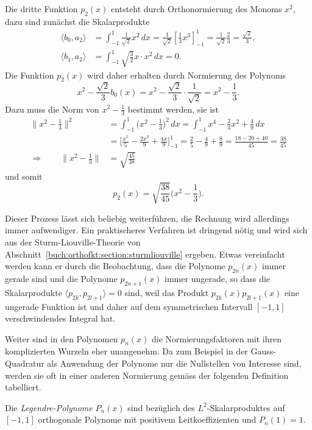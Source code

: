 Die dritte Funktion $p_2(x)$ entsteht durch Orthonormierung des
Monoms $x^2$, dazu sind zunächst die Skalarprodukte
\begin{align*}
\langle b_0,a_2\rangle
&=
\int_{-1}^1 \frac{1}{\!\sqrt{2}}x^2\,dx
=
\frac{1}{\!\sqrt{2}} [\frac13x^3]_{-1}^1
=
\frac{1}{\!\sqrt{2}} \frac{2}{3}
=
\frac{\!\sqrt{2}}{3},
\\
\langle b_1,a_2\rangle
&=
\int_{-1}^1 \!\sqrt{\frac{3}{2}} x \cdot x^2\,dx
= 
0.
\end{align*}
Die Funktion $p_2(x)$ wird daher erhalten durch Normierung des Polynoms
\[
x^2 - 
\frac{\!\sqrt{2}}{3} b_0(x)
=
x^2-
\frac{\!\sqrt{2}}{3}\cdot\frac{1}{\!\sqrt{2}}
=
x^2-\frac13.
\]
Dazu muss die Norm von $x^2-\frac13$ bestimmt werden, sie ist
\begin{align*}
\|x^2-\frac13\|^2
&=
\int_{-1}^1 \biggl(x^2-\frac13\biggr)^2\,dx
=
\int_{-1}^1 x^4-\frac23x^2+\frac{4}{9}\,dx
\\
&=
\biggl[\frac{x^5}{5} -\frac{2x^3}{9}+\frac{4x}{9}\biggr]_{-1}^1
=
\frac{2}{5} - \frac{4}{9} + \frac{8}{9}
=
\frac{18-20+40}{45}
=
\frac{38}{45}
\\
\Rightarrow\qquad
\|x^2-\frac13\|
&=
\!\sqrt{\frac{45}{38}}
\end{align*}
und somit
\[
p_2(x)
= 
\!\sqrt{\frac{38}{45}} \biggl(x^2-\frac13\biggr).
\]

Dieser Prozess lässt sich beliebig weiterführen, die Rechnung wird
allerdings immer aufwendiger.
Ein praktischeres Verfahren ist dringend nötig und wird sich
aus der Sturm-Liouville-Theorie von
Abschnitt~\ref{buch:orthofkt:section:sturmliouville} ergeben.
Etwas vereinfacht werden kann er durch die Beobachtung, dass die
Polynome $p_{2n}(x)$ immer gerade sind und die Polynome $p_{2n+1}(x)$
immer ungerade, so dass die Skalarprodukte 
$\langle p_{2k},p_{2l+1}\rangle=0$ sind, weil das Produkt
$p_{2k}(x)p_{2l+1}(x)$ eine ungerade Funktion ist und daher auf
dem symmetrischen Intervall $[-1,1]$ verschwindendes Integral hat.

Weiter sind in den Polynomen $p_n(x)$ die Normierungsfaktoren mit
ihren komplizierten Wurzeln eher unangenehm.
Da zum Beispiel in der Gauss-Quadratur als Anwendung der Polynome
nur die Nullstellen von Interesse sind, werden sie oft in einer
anderen Normierung gemäss der folgenden Definition tabelliert.

\begin{definition}
Die {\em Legendre-Polynome} $P_n(x)$ sind bezüglich des $L^2$-Skalarproduktes 
auf $[-1,1]$ orthogonale Polynome mit positivem Leitkoeffizienten und
$P_n(1)=1$.
\end{definition}

